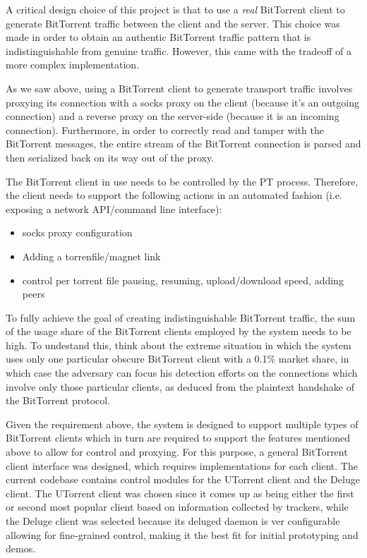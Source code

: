 \documentclass[11pt]{article} %
\begin{document}
A critical design choice of this project is that to use a \textit{real} BitTorrent client to generate BitTorrent traffic between the client and the server. This choice was made in order to obtain an authentic BitTorrent traffic pattern that is indistinguishable from genuine traffic. However, this came with the tradeoff of a more complex implementation.

As we saw above, using a BitTorrent client to generate transport traffic involves proxying its connection with a socks proxy on the client (because it's an outgoing connection) and a reverse proxy on the server-side (because it is an incoming connection). Furthermore, in order to correctly read and tamper with the BitTorrent messages, the entire stream of the BitTorrent connection is parsed and then serialized back on its way out of the proxy. 

 The BitTorrent client in use needs to be controlled by the PT process. Therefore, the client needs to support the following actions in an automated fashion (i.e. exposing a network API/command line interface):

\begin{itemize}
\item socks proxy configuration
\item Adding a torrenfile/magnet link
\item control per torrent file pausing, resuming, upload/download speed, adding peers
\end{itemize}

To fully achieve the goal of creating indistinguishable BitTorrent traffic, the sum of the usage share of the BitTorrent clients employed by the system needs to be high. To undestand this, think about the extreme situation in which the system uses only one particular obscure BitTorrent client with a 0.1\% market share, in which case the adversary can focus his detection efforts on the connections which involve only those particular clients, as deduced from the plaintext handshake of the BitTorrent protocol.

Given the requirement above, the system is designed to support multiple types of BitTorrent clients which in turn are required to support the features mentioned above to allow for control and proxying. For this purpose, a general BitTorrent client interface was designed, which requires implementations for each client. The current codebase contains control modules for the UTorrent client and the Deluge client. The UTorrent client  was chosen since it comes up as being either the first or second most popular client based on information collected by trackers, while the Deluge client was selected because its deluged daemon is ver configurable allowing for fine-grained control, making it the best fit for initial prototyping and demos. 
\end{document}
